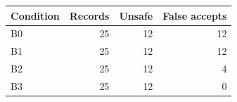 \begin{tabular}{lrrr}
Condition & Records & Unsafe & False accepts \\
\hline
B0 & 25 & 12 & 12 \\
B1 & 25 & 12 & 12 \\
B2 & 25 & 12 & 4 \\
B3 & 25 & 12 & 0 \\
\end{tabular}
